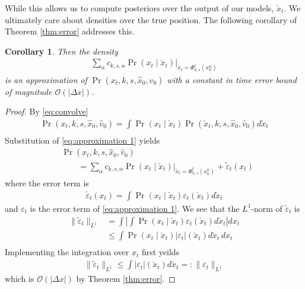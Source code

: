 \documentclass[conference]{IEEEtran}
\newtheorem{cor}{Corollary}
\begin{document}
While this allows us to compute posteriors over the output of our models, $\check{x}_t$.  We ultimately care about densities over the true position.
The following corollary of Theorem \ref{thm:error} addresses this.
\begin{cor} \label{cor:error}
	Then the density
	\begin{align}
		\sum_\alpha c_{k,s,\alpha} \left. \Pr( x_t \mid \check{x}_t ) \right|_{ \check{x}_t = \Phi_{k,s}^t( x_0^\alpha) } \label{eq:approximation 2}
	\end{align}
	is an approximation of $\Pr( x_t, k, s, \hat{x}_0, \hat{v}_0)$
	with a constant in time error bound of magnitude $\mathcal{O}( |\Delta x| )$.
\end{cor}
\begin{proof}
	By \eqref{eq:convolve}
	\begin{align*}
		\Pr(x_t, k, s, \hat{x}_0, \hat{v}_0) = \int \Pr( x_t \mid \check{x}_t ) \Pr( \check{x}_t, k,s,\hat{x}_0, \hat{v}_0) d\check{x}_t \\
	\end{align*}
	Substitution of \eqref{eq:approximation 1} yields
	\begin{align*}
		&\Pr(x_t, k, s, \hat{x}_0, \hat{v}_0) \\
		&\qquad = \sum_\alpha c_{k,s,\alpha} \left. \Pr( x_t \mid \check{x}_t ) \right|_{ \check{x}_t = \Phi_{k,s}^t( x_0^\alpha) } + \tilde{\varepsilon}_t(x_t)
	\end{align*}
	where the error term is
	\begin{align*}
		\tilde{\varepsilon}_t(x_t) = \int \Pr( x_t \mid \check{x}_t) \varepsilon_t( \check{x}_t) d \check{x}_t
	\end{align*}
	and $\varepsilon_t$ is the error term of \eqref{eq:approximation 1}.
	We see that the $L^1$-norm of $\tilde{\varepsilon}_t$ is 
	\begin{align*}
		\| \tilde{\varepsilon}_t \|_{L^1} &= \int \left| \int \Pr( x_t \mid \check{x}_t) \varepsilon_t( \check{x}_t) d \check{x}_t \right| dx_t \\
			&\leq \int \Pr( x_t \mid \check{x}_t ) | \varepsilon_t |( \check{x}_t) d\check{x}_t \, dx_t \\
	\end{align*}
	Implementing the integration over $x_t$ first yeilds
	\begin{align*}
		\| \tilde{\varepsilon}_t \|_{L^1} \leq \int | \varepsilon_t |( \check{x}_t) d\check{x}_t =: \| \varepsilon_t \|_{L^1}
	\end{align*}
	which is $\mathcal{O}( | \Delta x | )$ by Theorem \ref{thm:error}.
\end{proof}
\end{document}
